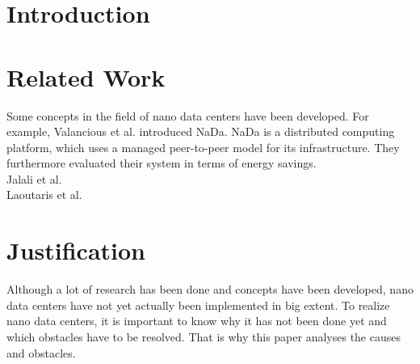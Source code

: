 \documentclass[sigchi-a, authorversion]{acmart}
\begin{document}

\maketitle

%  
%  
%  
%



\section{Introduction} %

\section{Related Work} %
Some concepts in the field of nano data centers have been developed. For example, Valancious et al. introduced NaDa. NaDa is a distributed computing platform, which uses a managed peer-to-peer model for its infrastructure. They furthermore evaluated their system in terms of energy savings. \\
Jalali et al. \\
Laoutaris et al. \\

\section{Justification} %
Although a lot of research has been done and concepts have been developed, nano data centers have not yet actually been implemented in big extent. To realize nano data centers, it is important to know why it has not been done yet and which obstacles have to be resolved. That is why this paper analyses the causes and obstacles.
\end{document}
